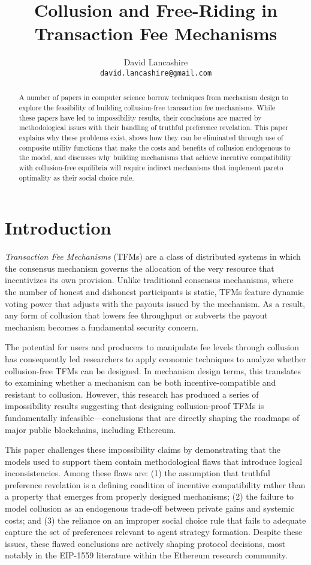 \documentclass[oneside]{article}   	%
\title{Collusion and Free-Riding in Transaction Fee Mechanisms}
\author{
  David Lancashire\\
  \texttt{david.lancashire@gmail.com}\\
}
\begin{document}
\maketitle


\begin{abstract}
A number of papers in computer science borrow techniques from mechanism design to explore the feasibility of building collusion-free transaction fee mechanisms. While these papers have led to impossibility results, their conclusions are marred by methodological issues with their handling of truthful preference revelation. This paper explains why these problems exist, shows how they can be eliminated through use of composite utility functions that make the costs and benefits of collusion endogenous to the model, and discusses why building mechanisms that achieve incentive compatibility with collusion-free equilibria will require indirect mechanisms that implement pareto optimality as their social choice rule.
\end{abstract}

\section{Introduction \label{sec::introduction}}

\emph{Transaction Fee Mechanisms} (TFMs) are a class of distributed systems in which the consensus mechanism governs the allocation of the very resource that incentivizes its own provision. Unlike traditional consensus mechanisms, where the number of honest and dishonest participants is static, TFMs feature dynamic voting power that adjusts with the payouts issued by the mechanism. As a result, any form of collusion that lowers fee throughput or subverts the payout mechanism becomes a fundamental security concern.

The potential for users and producers to manipulate fee levels through collusion has consequently led researchers to apply economic techniques to analyze whether collusion-free TFMs can be designed. In mechanism design terms, this translates to examining whether a mechanism can be both incentive-compatible and resistant to collusion. However, this research has produced a series of impossibility results suggesting that designing collusion-proof TFMs is fundamentally infeasible—conclusions that are directly shaping the roadmaps of major public blockchains, including Ethereum.

This paper challenges these impossibility claims by demonstrating that the models used to support them contain methodological flaws that introduce logical inconsistencies. Among these flaws are: (1) the assumption that truthful preference revelation is a defining condition of incentive compatibility rather than a property that emerges from properly designed mechanisms; (2) the failure to model collusion as an endogenous trade-off between private gains and systemic costs; and (3) the reliance on an improper social choice rule that fails to adequate capture the set of preferences relevant to agent strategy formation. Despite these issues, these flawed conclusions are actively shaping protocol decisions, most notably in the EIP-1559 literature within the Ethereum research community.
\end{document}
